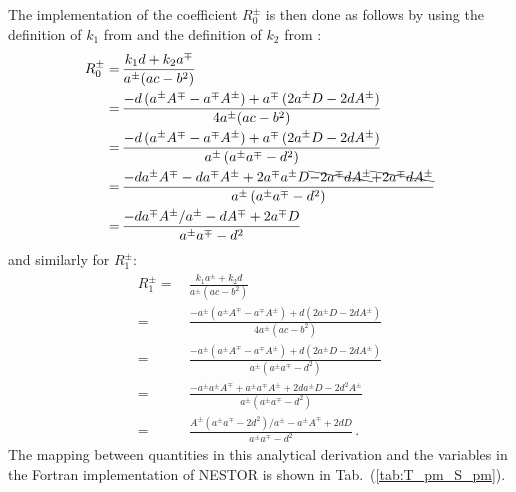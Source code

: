 The implementation of the coefficient $R^{\pm}_0$ is then done as follows
by using the definition of $k_1$ from 
and the definition of $k_2$ from :
\begin{align}
  R^{\pm}_0
  =&\, \frac{k_1 d + k_2 a^{\mp}}{a^{\pm}(ac-b^2)} \nonumber \\
  =&\, \frac{-d\left( a^{\pm} A^{\mp} - a^{\mp} A^{\pm} \right) + a^{\mp} \left( 2 a^{\pm} D - 2 d A^{\pm} \right) }{4 a^{\pm}(ac-b^2)} \nonumber \\
  =&\, \frac{-d\left( a^{\pm} A^{\mp} - a^{\mp} A^{\pm} \right) + a^{\mp} \left( 2 a^{\pm} D - 2 d A^{\pm} \right) }{a^{\pm} \left( a^{\pm}a^{\mp} - d^2 \right)} \nonumber \\
  =&\, \frac{-d  a^{\pm} A^{\mp} - d a^{\mp} A^{\pm} + 2 a^{\mp} a^{\pm} D \bcancel{- 2 a^{\mp} d A^{\pm}} \bcancel{+ 2 a^{\mp} d A^{\pm}} }{a^{\pm} \left( a^{\pm}a^{\mp} - d^2 \right)} \nonumber \\
  =&\, \frac{- d a^{\mp} A^{\pm}/a^{\pm} -d  A^{\mp}  + 2 a^{\mp} D  }{ a^{\pm}a^{\mp} - d^2 }
\end{align}
and similarly for $R^{\pm}_1$:
\begin{align}
  R^{\pm}_1
  =&\, \frac{k_1 a^{\pm} + k_2 d}{a^{\pm}(ac-b^2)} \nonumber \\
  =&\, \frac{-a^{\pm} \left( a^{\pm} A^{\mp} - a^{\mp} A^{\pm} \right) + d \left( 2 a^{\pm} D - 2 d A^{\pm} \right) }{4 a^{\pm}(ac-b^2)} \nonumber \\
  =&\, \frac{-a^{\pm} \left( a^{\pm} A^{\mp} - a^{\mp} A^{\pm} \right) + d \left( 2 a^{\pm} D - 2 d A^{\pm} \right) }{a^{\pm} \left( a^{\pm}a^{\mp} - d^2 \right)} \nonumber \\
  =&\, \frac{-a^{\pm} a^{\pm} A^{\mp} + a^{\pm} a^{\mp} A^{\pm} + 2 d a^{\pm} D - 2 d^2 A^{\pm} }{a^{\pm} \left( a^{\pm}a^{\mp} - d^2 \right)} \nonumber \\
  =&\, \frac{A^{\pm} \left( a^{\pm} a^{\mp} - 2 d^2 \right)/a^{\pm} - a^{\pm} A^{\mp} + 2 d D }{ a^{\pm}a^{\mp} - d^2 } \, .
\end{align}
The mapping between quantities in this analytical derivation
and the variables in the Fortran implementation of NESTOR is shown in Tab.~(\ref{tab:T_pm_S_pm}).
